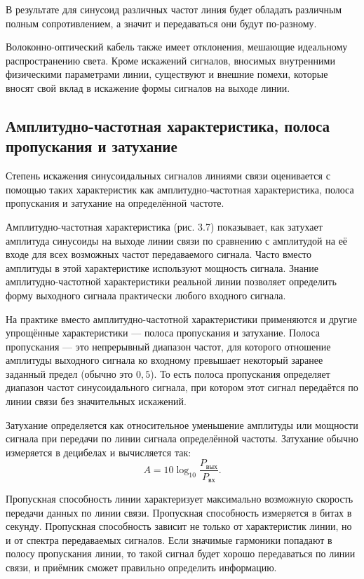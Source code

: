 \documentclass[
	a4paper,
	oneside,
	BCOR = 10mm,
	DIV = 12,
	12pt,
	headings = normal,
]{scrartcl}
\begin{document}
				В результате для синусоид различных частот линия будет обладать различным полным сопротивлением, а значит и передаваться они будут по-разному.

				Волоконно-оптический кабель также имеет отклонения, мешающие идеальному распространению света. Кроме искажений сигналов, вносимых внутренними физическими параметрами линии, существуют и внешние помехи, которые вносят свой вклад в искажение формы сигналов на выходе линии.

			\subsection{Амплитудно-частотная характеристика, полоса пропускания и затухание}
				Степень искажения синусоидальных сигналов линиями связи оценивается с помощью таких характеристик как амплитудно-частотная характеристика, полоса пропускания и затухание на определённой частоте.

				Амплитудно-частотная характеристика (рис. 3.7) показывает, как затухает амплитуда синусоиды на выходе линии связи по сравнению с амплитудой на её входе для всех возможных частот передаваемого сигнала. Часто вместо амплитуды в этой характеристике используют мощность сигнала. Знание амплитудно-частотной характеристики реальной линии позволяет определить форму выходного сигнала практически любого входного сигнала.

				На практике вместо амплитудно-частотной характеристики применяются и другие упрощённые характеристики — полоса пропускания и затухание. Полоса пропускания — это непрерывный диапазон частот, для которого отношение амплитуды выходного сигнала ко входному превышает некоторый заранее заданный предел (обычно это $0{,}5$). То есть полоса пропускания определяет диапазон частот синусоидального сигнала, при котором этот сигнал передаётся по линии связи без значительных искажений.

				Затухание определяется как относительное уменьшение амплитуды или мощности сигнала при передачи по линии сигнала определённой частоты. Затухание обычно измеряется в децибелах и вычисляется так:
				\[
					A = 10 \log_{10} \frac{P_{\text{вых}}}{P_{\text{вх}}}.
				\]

				Пропускная способность линии характеризует максимально возможную скорость передачи данных по линии связи. Пропускная способность измеряется в битах в секунду. Пропускная способность зависит не только от характеристик линии, но и от спектра передаваемых сигналов. Если значимые гармоники попадают в полосу пропускания линии, то такой сигнал будет хорошо передаваться по линии связи, и приёмник сможет правильно определить информацию.
\end{document}
